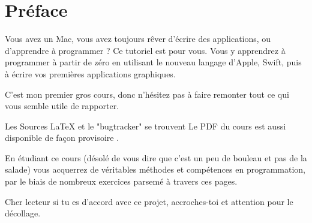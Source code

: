 \chapter*{Préface}
{}
Vous avez un Mac, vous avez toujours rêver d'écrire des applications, ou d'apprendre à programmer ?
Ce tutoriel est pour vous.
Vous y apprendrez à programmer à partir de zéro %
en utilisant le nouveau langage d'Apple, Swift, puis à écrire vos premières applications graphiques.

C'est mon premier gros cours, donc n'hésitez pas à faire remonter tout ce qui vous semble utile de rapporter.

Les Sources LaTeX et le "bugtracker" se trouvent 
Le PDF du cours est aussi disponible de façon provisoire .

En étudiant ce cours
(désolé de vous dire que c'est un peu de bouleau et pas de la salade)
vous acquerrez de véritables méthodes et compétences en programmation,
par le biais de nombreux exercices parsemé à travers ces pages.

Cher lecteur si tu es d'accord avec ce projet, accroches-toi et attention pour le décollage.

